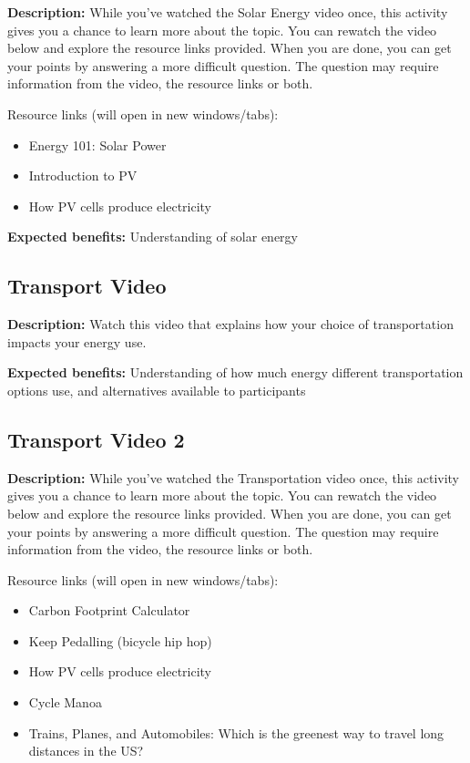 \textbf{Description:} While you've watched the Solar Energy video once, this activity gives you a chance to learn more about the topic. You can rewatch the video below and explore the resource links provided. When you are done, you can get your points by answering a more difficult question. The question may require information from the video, the resource links or both.

Resource links (will open in new windows/tabs):

\begin{itemize}
	\item Energy 101: Solar Power
	\item Introduction to PV
	\item How PV cells produce electricity
\end{itemize}

\vspace{2ex}
\textbf{Expected benefits:} Understanding of solar energy


\subsection{Transport Video}

\textbf{Description:} Watch this video that explains how your choice of transportation impacts your energy use.

\vspace{2ex}
\textbf{Expected benefits:} Understanding of how much energy different transportation options use, and alternatives available to participants


\subsection{Transport Video 2}

\textbf{Description:} While you've watched the Transportation video once, this activity gives you a chance to learn more about the topic. You can rewatch the video below and explore the resource links provided. When you are done, you can get your points by answering a more difficult question. The question may require information from the video, the resource links or both.

Resource links (will open in new windows/tabs):

\begin{itemize}
	\item Carbon Footprint Calculator
	\item Keep Pedalling (bicycle hip hop)
	\item How PV cells produce electricity
	\item Cycle Manoa
	\item Trains, Planes, and Automobiles: Which is the greenest way to travel long distances in the US?
\end{itemize}

